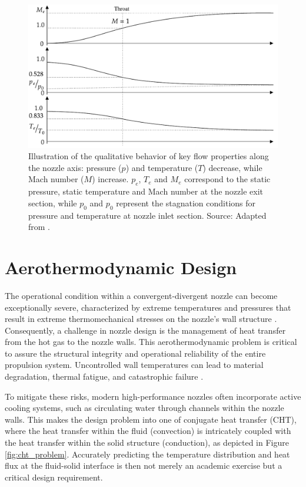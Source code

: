 \documentclass[tg, EN]{ufabcFHZh_tg}
\begin{document}
\begin{figure}[H]
    \centering
    \includegraphics[width=\textwidth]{Figuras/cd_nozzle_qualitative.pdf} 
    \caption{Illustration of the qualitative behavior of key flow properties along the nozzle axis: pressure ($p$) and temperature ($T$) decrease, while Mach number ($M$) increase. $p_e$, $T_e$ and $M_e$ correspond to the static pressure, static temperature and Mach number at the nozzle exit section, while $p_0$ and $p_0$ represent the stagnation conditions for pressure and temperature at nozzle inlet section. Source: Adapted from \cite{anderson2003}.}
    \label{fig:nozzle_qualitative}
\end{figure}



\section{Aerothermodynamic Design}

The operational condition within a convergent-divergent nozzle can become exceptionally severe, characterized by extreme temperatures and pressures that result in extreme thermomechanical stresses on the nozzle's wall structure \citep{sutton2010, back1964}. Consequently, a challenge in nozzle design is the management of heat transfer from the hot gas to the nozzle walls. This aerothermodynamic problem is critical to assure the structural integrity and operational reliability of the entire propulsion system. Uncontrolled wall temperatures can lead to material degradation, thermal fatigue, and catastrophic failure \citep{back1964}.

To mitigate these risks, modern high-performance nozzles often incorporate active cooling systems, such as circulating water through channels within the nozzle walls. This makes the design problem into one of conjugate heat transfer (CHT), where the heat transfer within the fluid (convection) is intricately coupled with the heat transfer within the solid structure (conduction), as depicted in Figure \ref{fig:cht_problem}. Accurately predicting the temperature distribution and heat flux at the fluid-solid interface is then not merely an academic exercise but a critical design requirement.
\end{document}
